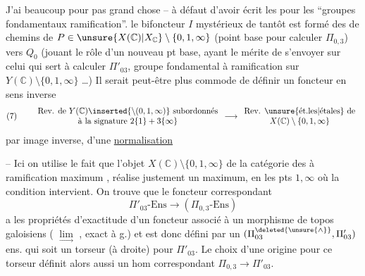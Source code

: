 J'ai beaucoup  pour pas grand chose -- à défaut d'avoir écrit les    pour les ``groupes fondamentaux  ramification''.  le bifoncteur $I$ mystérieux de tantôt est formé des  de chemins de $P\in\unsure{X(\mathbb C)|X_{\mathbb C}}\setminus\{0,1,\infty\}$ (point base pour calculer $\Pi_{0,3}$) vers $Q_0$ (jouant le rôle d'un nouveau pt base, ayant le mérite de s'envoyer sur celui  qui sert à calculer $\Pi'_{03}$, groupe fondamental à ramification sur $Y(\mathbb C)\setminus\{0,1,\infty\}$ \dots) Il serait peut-être plus commode de définir  un foncteur en sens inverse
\[
(7)\qquad
\begin{array}{c}
\text{Rev. de }Y(\mathbb C)\inserted{\setminus(0,1,\infty)}\ \text{subordonnés}\\
\text{à la signature }2\{1\}+3\{\infty\}
\end{array}
\longrightarrow
\begin{array}{c}
\text{Rev. \unsure{ét.les|étales} de}\\
X(\mathbb C)\setminus\{0,1,\infty\}
\end{array}
\]
par image inverse,  d'une \uline{normalisation}

-- Ici on utilise le fait que l'objet $X(\mathbb C)\setminus\{0,1,\infty\}$ de la catégorie des  à ramification maximum , réalise justement un maximum, en les pts $1,\infty$ où la condition intervient.
On trouve que le foncteur correspondant
\[
\tag{7 bis}
\Pi'_{03}\text{-}\mathrm{Ens}\longrightarrow(\Pi_{0,3}\text{-}\mathrm{Ens})
\]
a les propriétés d'exactitude d'un foncteur associé à un morphisme de topos galoisiens
( $\underset{\longrightarrow}{\lim}$ , exact à g.) et est donc défini par un $(\Pi_{03}^{\deleted{\unsure{\wedge}}},\Pi'_{03})$ ens. qui soit un torseur (à droite) pour $\Pi'_{03}$. Le choix d'une origine pour ce torseur définit alors aussi un hom correspondant $\Pi_{0,3}\longrightarrow\Pi'_{03}$.


